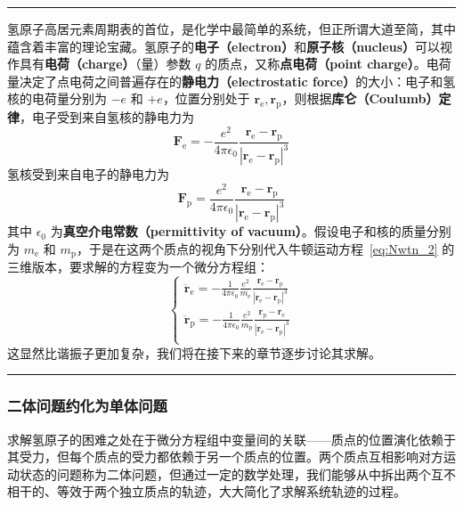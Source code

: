 \documentclass[cn,10pt,math=newtx,citestyle=gb7714-2015,bibstyle=gb7714-2015]{elegantbook}
\def\bm{\boldsymbol}
\def\srule{\noindent\rule{\linewidth}{0.3mm}}
\begin{document}
\srule

\begin{instance}[氢原子]
氢原子高居元素周期表的首位，是化学中最简单的系统，但正所谓大道至简，其中蕴含着丰富的理论宝藏。氢原子的\textbf{电子（electron）}和\textbf{原子核（nucleus）}可以视作具有\textbf{电荷（charge）}（量）参数 $q$ 的质点，又称\textbf{点电荷（point charge）}。电荷量决定了点电荷之间普遍存在的\textbf{静电力（electrostatic force）}的大小：电子和氢核的电荷量分别为 $-e$ 和 $+e$，位置分别处于 $\bm r_\text{e},\bm r_\text{p}$，则根据\textbf{库仑（Coulumb）定律}，电子受到来自氢核的静电力为
\begin{equation*}
    \bm F_\text{e} = -\frac{e^2}{4\pi\epsilon_0}\frac{\bm r_\text{e}-\bm r_\text{p}}{\left|\bm r_\text{e}-\bm r_\text{p}\right|^3}
\end{equation*}
氢核受到来自电子的静电力为
\begin{equation*}
    \bm F_\text{p} = \frac{e^2}{4\pi\epsilon_0}\frac{\bm r_\text{e}-\bm r_\text{p}}{\left|\bm r_\text{e}-\bm r_\text{p}\right|^3}
\end{equation*}
其中 $\epsilon_0$ 为\textbf{真空介电常数（permittivity of vacuum）}。假设电子和核的质量分别为 $m_\text{e}$ 和 $m_\text{p}$，于是在这两个质点的视角下分别代入牛顿运动方程~\ref{eq:Nwtn_2} 的三维版本，要求解的方程变为一个微分方程组：
\begin{equation}\label{eq:H_pnt_chrg}
    \begin{cases}
        \ddot{\bm r}_\text{e} = -\frac{1}{4\pi\epsilon_0}\frac{e^2}{m_\text{e}}\frac{\bm r_\text{e}-\bm r_\text{p}}{\left|\bm r_\text{e}-\bm r_\text{p}\right|^3}\\
        \ddot{\bm r}_\text{p} = -\frac{1}{4\pi\epsilon_0}\frac{e^2}{m_\text{p}}\frac{\bm r_\text{p}-\bm r_\text{e}}{\left|\bm r_\text{e}-\bm r_\text{p}\right|^3}\\
    \end{cases}
\end{equation}
这显然比谐振子更加复杂，我们将在接下来的章节逐步讨论其求解。
\end{instance}

\srule

\subsubsection{二体问题约化为单体问题}
求解氢原子的困难之处在于微分方程组中变量间的关联——质点的位置演化依赖于其受力，但每个质点的受力都依赖于另一个质点的位置。两个质点互相影响对方运动状态的问题称为二体问题，但通过一定的数学处理，我们能够从中拆出两个互不相干的、等效于两个独立质点的轨迹，大大简化了求解系统轨迹的过程。
\end{document}
